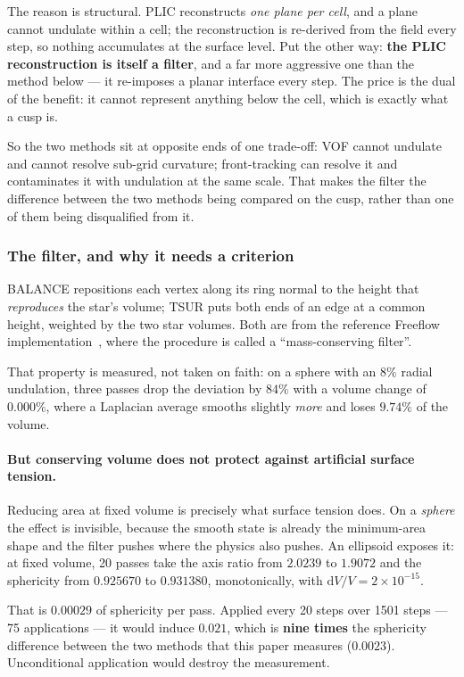 The reason is structural. PLIC reconstructs \emph{one plane per cell}, and a
plane cannot undulate within a cell; the reconstruction is re-derived from the
field every step, so nothing accumulates at the surface level. Put the other
way: \textbf{the PLIC reconstruction is itself a filter}, and a far more
aggressive one than the method below --- it re-imposes a planar interface every
step. The price is the dual of the benefit: it cannot represent anything below
the cell, which is exactly what a cusp is.

So the two methods sit at opposite ends of one trade-off: VOF cannot undulate
and cannot resolve sub-grid curvature; front-tracking can resolve it and
contaminates it with undulation at the same scale. That makes the filter the
difference between the two methods being compared on the cusp, rather than one
of them being disqualified from it.

\subsubsection{The filter, and why it needs a criterion}

BALANCE repositions each vertex along its ring normal to the height that
\emph{reproduces} the star's volume; TSUR puts both ends of an edge at a common
height, weighted by the two star volumes. Both are from the reference
Freeflow implementation~\cite{desousa2004}, where the procedure is called a
``mass-conserving filter''.

That property is measured, not taken on faith: on a sphere with an $8\%$ radial
undulation, three passes drop the deviation by $84\%$ with a volume change of
$0.000\%$, where a Laplacian average smooths slightly \emph{more} and loses
$9.74\%$ of the volume.

\paragraph{But conserving volume does not protect against artificial surface
tension.} Reducing area at fixed volume is precisely what surface tension does.
On a \emph{sphere} the effect is invisible, because the smooth state is already
the minimum-area shape and the filter pushes where the physics also pushes. An
ellipsoid exposes it: at fixed volume, 20 passes take the axis ratio from
$2.0239$ to $1.9072$ and the sphericity from $0.925670$ to $0.931380$,
monotonically, with $\mathrm{d}V/V = 2\times10^{-15}$.

That is $0.00029$ of sphericity per pass. Applied every 20 steps over 1501
steps --- 75 applications --- it would induce $0.021$, which is \textbf{nine
times} the sphericity difference between the two methods that this paper
measures ($0.0023$). Unconditional application would destroy the measurement.


